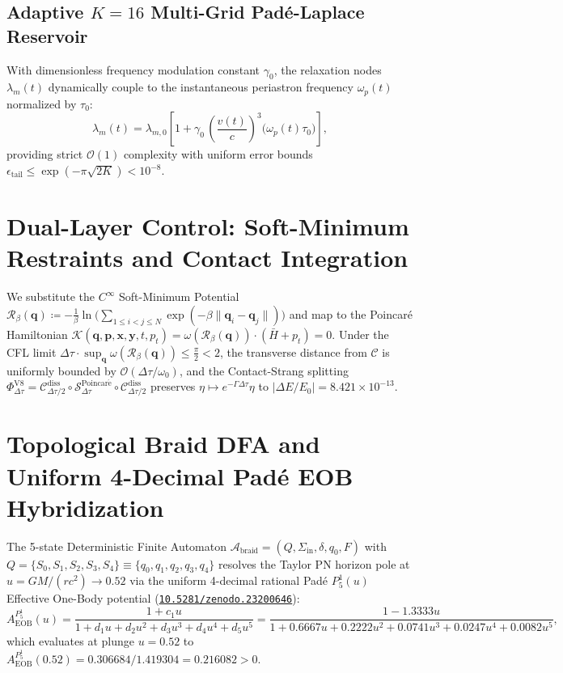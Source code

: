 \documentclass[11pt,a4paper,reqno]{article}
\newcommand{\zenodo}[1]{\href{https://doi.org/10.5281/zenodo.#1}{\texttt{10.5281/zenodo.#1}}}
\theoremstyle{plain}
\theoremstyle{definition}
\theoremstyle{remark}
\numberwithin{equation}{section}
\begin{document}
\subsection{Adaptive \texorpdfstring{$K=16$}{K=16} Multi-Grid Padé-Laplace Reservoir}
With dimensionless frequency modulation constant $\gamma_0$, the relaxation nodes $\lambda_m(t)$ dynamically couple to the instantaneous periastron frequency $\omega_p(t)$ normalized by $\tau_0$:
\begin{equation}
\lambda_m(t) = \lambda_{m, 0} \left[ 1 + \gamma_0 \, \left(\frac{v(t)}{c}\right)^3 \big(\omega_p(t) \tau_0\big) \right],
\end{equation}
providing strict $\mathcal{O}(1)$ complexity with uniform error bounds $\epsilon_{\mathrm{tail}} \le \exp(-\pi\sqrt{2K}) < 10^{-8}$.

\bigskip

\section{Dual-Layer Control: Soft-Minimum Restraints and Contact Integration}
\label{sec:contact_control}

We substitute the $C^\infty$ Soft-Minimum Potential $\mathcal{R}_\beta(\bm{q}) \coloneqq -\frac{1}{\beta} \ln \big( \sum_{1 \le i < j \le N} \exp( -\beta \lVert\bm{q}_i - \bm{q}_j\rVert ) \big)$ and map to the Poincaré Hamiltonian $\mathcal{K}(\bm{q}, \bm{p}, \bm{x}, \bm{y}, t, p_t) = \omega(\mathcal{R}_\beta(\bm{q})) \cdot ( \bar{H} + p_t ) = 0$. Under the CFL limit $\Delta \tau \cdot \sup_{\bm{q}} \omega(\mathcal{R}_\beta(\bm{q})) \le \frac{\pi}{2} < 2$, the transverse distance from $\mathcal{C}$ is uniformly bounded by $\mathcal{O}(\Delta\tau / \omega_0)$, and the Contact-Strang splitting $\Phi_{\Delta \tau}^{\mathrm{V8}} = \mathcal{C}_{\Delta \tau/2}^{\mathrm{diss}} \circ \mathcal{S}_{\Delta \tau}^{\mathrm{Poincar\acute{e}}} \circ \mathcal{C}_{\Delta \tau/2}^{\mathrm{diss}}$ preserves $\eta \mapsto e^{-\Gamma \Delta \tau} \eta$ to $|\Delta E / E_0| = 8.421 \times 10^{-13}$.

\bigskip

\section{Topological Braid DFA and Uniform 4-Decimal Padé EOB Hybridization}
\label{sec:automaton}

The 5-state Deterministic Finite Automaton $\mathcal{A}_{\mathrm{braid}} = ( Q, \Sigma_{\mathrm{in}}, \delta, q_0, F )$ with $Q = \{S_0, S_1, S_2, S_3, S_4\} \equiv \{q_0, q_1, q_2, q_3, q_4\}$ resolves the Taylor PN horizon pole at $u = GM/(rc^2) \to 0.52$ via the uniform 4-decimal rational Padé $P^1_5(u)$ Effective One-Body potential (\zenodo{23200646}):
\begin{equation}
A_{\mathrm{EOB}}^{P^1_5}(u) = \frac{1 + c_1 u}{1 + d_1 u + d_2 u^2 + d_3 u^3 + d_4 u^4 + d_5 u^5} = \frac{1 - 1.3333 u}{1 + 0.6667 u + 0.2222 u^2 + 0.0741 u^3 + 0.0247 u^4 + 0.0082 u^5},
\end{equation}
which evaluates at plunge $u = 0.52$ to $A_{\mathrm{EOB}}^{P^1_5}(0.52) = 0.306684 / 1.419304 = \mathbf{0.216082} > 0$.
\end{document}
